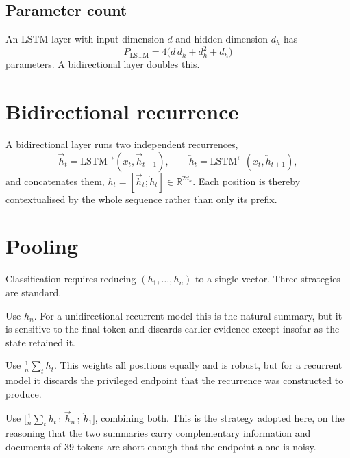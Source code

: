 \subsection{Parameter count}

An LSTM layer with input dimension $d$ and hidden dimension $d_h$ has
\begin{equation}
P_{\text{LSTM}} = 4\big(d\,d_h + d_h^2 + d_h\big)
\end{equation}
parameters. A bidirectional layer doubles this.

\section{Bidirectional recurrence}

A bidirectional layer runs two independent recurrences,
\begin{equation}
\overrightarrow{h}_t = \text{LSTM}^{\rightarrow}(x_t, \overrightarrow{h}_{t-1}), \qquad
\overleftarrow{h}_t  = \text{LSTM}^{\leftarrow}(x_t, \overleftarrow{h}_{t+1}),
\end{equation}
and concatenates them, $h_t = [\overrightarrow{h}_t ; \overleftarrow{h}_t] \in \mathbb{R}^{2d_h}$.
Each position is thereby contextualised by the whole sequence rather than only its prefix.

\section{Pooling}
\label{sec:pooling}

Classification requires reducing $(h_1,\dots,h_n)$ to a single vector. Three strategies are
standard.

 Use $h_n$. For a unidirectional recurrent model this is the natural
summary, but it is sensitive to the final token and discards earlier evidence except insofar as the
state retained it.

 Use $\frac{1}{n}\sum_t h_t$. This weights all positions equally and is
robust, but for a recurrent model it discards the privileged endpoint that the recurrence was
constructed to produce.

 Use $\big[\tfrac{1}{n}\sum_t h_t \,;\, \overrightarrow{h}_n \,;\,
\overleftarrow{h}_1\big]$, combining both. This is the strategy adopted here, on the reasoning that
the two summaries carry complementary information and documents of 39 tokens are short enough that
the endpoint alone is noisy.

